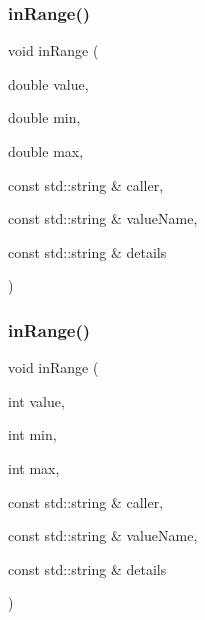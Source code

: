\subsubsection{\texorpdfstring{in\+Range()}{inRange()}\hspace{0.1cm}{\footnotesize\ttfamily [1/2]}}
{\footnotesize\ttfamily void in\+Range (\begin{DoxyParamCaption}\item[{double}]{value,  }\item[{double}]{min,  }\item[{double}]{max,  }\item[{const std\+::string \&}]{caller,  }\item[{const std\+::string \&}]{value\+Name,  }\item[{const std\+::string \&}]{details }\end{DoxyParamCaption})}

\mbox{\label{namespacerequire_a2bed18b6b26c6992e2fd619f5d02901e}} 
\subsubsection{\texorpdfstring{in\+Range()}{inRange()}\hspace{0.1cm}{\footnotesize\ttfamily [2/2]}}
{\footnotesize\ttfamily void in\+Range (\begin{DoxyParamCaption}\item[{int}]{value,  }\item[{int}]{min,  }\item[{int}]{max,  }\item[{const std\+::string \&}]{caller,  }\item[{const std\+::string \&}]{value\+Name,  }\item[{const std\+::string \&}]{details }\end{DoxyParamCaption})}

\mbox{\label{namespacerequire_a97b809ede8444f0621dde4323bdc2bf7}} 
